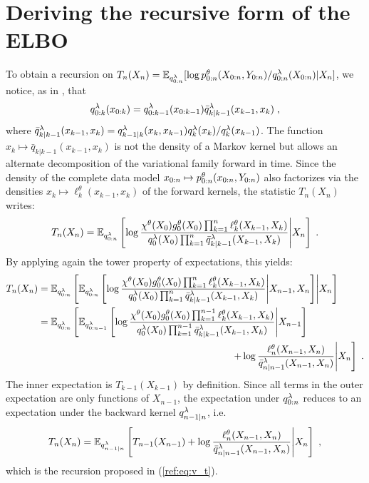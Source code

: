 \documentclass{article}
\begin{document}
\section{Deriving the recursive form of the ELBO}

To obtain a recursion on $T_n(X_n) = \mathbb{E}_{q_{0:n}^{\lambda}}[\log p^{\theta}_{0:n}(X_{0:n},Y_{0:n})/q_{0:n}^{\lambda}(X_{0:n}) \vert X_n]$, we notice, as in \cite{campbell2021online}, that $$
q_{0:k}^{\lambda}(x_{0:k}) = q_{0:k-1}^{\lambda}(x_{0:k-1})\bar{q}_{k\vert k-1}^\lambda(x_{k-1}, x_k) \;,
$$ where $\bar{q}_{k\vert k-1}^\lambda(x_{k-1}, x_k) = q_{k-1 \vert k}^{\lambda}(x_k, x_{k-1})  q_{k}^{\lambda}(x_k) / q_{k}^{\lambda}(x_{k-1})$. The function $x_k \mapsto \bar{q}_{k\vert k-1}(x_{k-1}, x_k)$ is not the density of a Markov kernel but allows an alternate decomposition of the variational family forward in time. Since the density of the complete data model $x_{0:n}\mapsto p^{\theta}_{0:n}(x_{0:n},Y_{0:n})$ also factorizes via the densities $x_k\mapsto \ell_k^\theta(x_{k-1}, x_k)$ of the forward kernels, the statistic $T_n(X_n)$ writes: 
$$
T_n(X_n) = \mathbb{E}_{q_{0:n}^{\lambda}}\left[\log \frac{\chi^\theta(X_0) g_{0}^{\theta}(X_0) \prod_{k=1}^n \ell_k^\theta(X_{k-1}, X_k)}{q_{0}^{\lambda}(X_0)\prod_{k=1}^n \bar{q}_{k\vert k-1}^\lambda(X_{k-1}, X_k)} \middle\vert X_n\right]\;.
$$
By applying again the tower property of expectations, this yields:
\begin{align*}
T_n(X_n) &= \pE_{\vd{0:n}}\left[\pE_{\vd{0:n}}\left[\log \frac{\chi^\theta(X_0) \md{0}{\theta}(X_0) \prod_{k=1}^n \ell_k^\theta(X_{k-1}, X_k)}{\vd{0}(X_0)\prod_{k=1}^n \bar{q}_{k\vert k-1}^\lambda(X_{k-1}, X_k)} \middle\vert X_{n-1}, X_n \right] \middle\vert X_n\right] \\
&= \pE_{\vd{0:n}}\left[\pE_{\vd{0:n-1}}\left[\log \frac{\chi^\theta(X_0) \md{0}{\theta}(X_0) \prod_{k=1}^{n-1} \ell_k^\theta(X_{k-1}, X_k)}{\vd{0}(X_0)\prod_{k=1}^{n-1} \bar{q}_{k\vert k-1}^\lambda(X_{k-1}, X_k)} \middle\vert X_{n-1} \right]\right.\\
&\left. \hspace{7cm}+ \log \frac{\ell_n^\theta(X_{n-1}, X_n)}{\bar{q}_{n\vert n-1}^\lambda(X_{n-1}, X_n)}\middle\vert X_n\right]\eqsp.
\end{align*}
The inner expectation is $T_{k-1}(X_{k-1})$ by definition. Since all terms in the outer expectation are only functions of $X_{n-1}$, the expectation under $q_{0:n}^{\lambda}$ reduces to an expectation under the backward kernel $q_{n-1 \vert n}^{\lambda}$, i.e. 
$$
T_n(X_n) = \mathbb{E}_{q_{n-1 \vert n}^{\lambda}} \left[T_{n-1}(X_{n-1})  + \log \frac{\ell_n^\theta(X_{n-1}, X_n)}{\bar{q}_{n\vert n-1}^\lambda(X_{n-1}, X_n)}\middle\vert X_n\right]\;,
$$
which is the recursion proposed in (\ref{ref:eq:v_t}).
\end{document}
